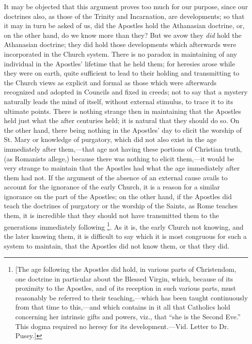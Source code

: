 It may be objected that this argument proves too
much for our purpose, since our doctrines also, as those of the
Trinity and Incarnation, are developments; so that it may in turn be
asked of us, did the Apostles hold the Athanasian doctrine, or, on the
other hand, do we know more than they? But we avow they \emph{did} hold the
Athanasian doctrine; they did hold those developments which afterwards
were incorporated in the Church system. There is no paradox in
maintaining of any individual in the Apostles' lifetime that he
held them; for heresies arose while they were on earth, quite
sufficient to lead to their holding and transmitting to the Church
views as explicit and formal as those which were afterwards recognized
and adopted in Councils and fixed in creeds; not to say that a mystery
naturally leads the mind of itself, without external stimulus, to
trace it to its ultimate points. There is nothing strange then in
maintaining that the Apostles held just what the after centuries held;
it is natural that they should do so. On the other hand, there being
nothing in the Apostles' day to elicit the worship of St. Mary or
knowledge of purgatory, which did not also exist in the age
immediately after them,—that age not having these portions of
Christian truth, (as Romanists allege,) because there was nothing to
elicit them,—it would be very strange to maintain that the Apostles
had what the age immediately after them had not. If the argument of
the absence of an external cause avails to account for the ignorance
of the early Church, it is a reason for a similar ignorance on the
part of the Apostles; on the other hand, if the Apostles did teach the
doctrines of purgatory or the worship of the Saints, as Rome teaches
them, it is incredible that they should not have transmitted them to
the generations immediately following \footnote{[The age following the Apostles did hold, in various parts of
Christendom, one doctrine in particular about the Blessed Virgin,
which, because of its proximity to the Apostles, and of its reception
in such various parts, must reasonably be referred to their
teaching,—which has been taught continuously from that time to
this,—and which contains in it all that Catholics hold concerning
her intrinsic gifts and powers, viz., that ``she is the Second Eve.''
This dogma required no heresy for its development.—Vid. Letter to
Dr. Pusey.]}. As it is, the early Church not knowing, and the later knowing
them, it is difficult to say which it is most congruous for such a
system to maintain, that the Apostles did not know them, or that
they did.

